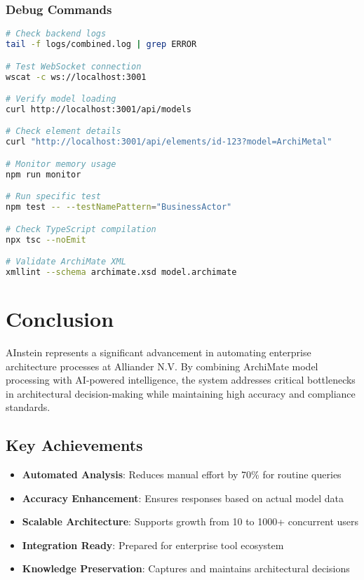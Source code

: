 \documentclass[12pt,a4paper]{report}
\begin{document}
\subsection{Debug Commands}

\begin{lstlisting}[language=bash, caption=Useful Debug Commands]
# Check backend logs
tail -f logs/combined.log | grep ERROR

# Test WebSocket connection
wscat -c ws://localhost:3001

# Verify model loading
curl http://localhost:3001/api/models

# Check element details
curl "http://localhost:3001/api/elements/id-123?model=ArchiMetal"

# Monitor memory usage
npm run monitor

# Run specific test
npm test -- --testNamePattern="BusinessActor"

# Check TypeScript compilation
npx tsc --noEmit

# Validate ArchiMate XML
xmllint --schema archimate.xsd model.archimate
\end{lstlisting}

\chapter{Conclusion}

AInstein represents a significant advancement in automating enterprise architecture processes at Alliander N.V. By combining ArchiMate model processing with AI-powered intelligence, the system addresses critical bottlenecks in architectural decision-making while maintaining high accuracy and compliance standards.

\section{Key Achievements}

\begin{itemize}
    \item \textbf{Automated Analysis}: Reduces manual effort by 70\% for routine queries
    \item \textbf{Accuracy Enhancement}: Ensures responses based on actual model data
    \item \textbf{Scalable Architecture}: Supports growth from 10 to 1000+ concurrent users
    \item \textbf{Integration Ready}: Prepared for enterprise tool ecosystem
    \item \textbf{Knowledge Preservation}: Captures and maintains architectural decisions
\end{itemize}
\end{document}
